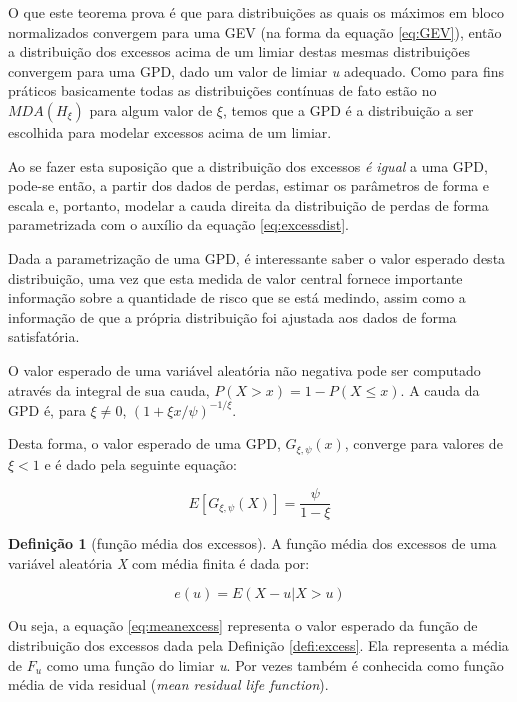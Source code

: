 \documentclass[review]{elsarticle}
\theoremstyle{definition}
\newtheorem{defi}[teor]{Definição}
\begin{document}
O que este teorema prova é que para distribuições as quais os máximos em bloco normalizados convergem para uma GEV (na forma da equação \eqref{eq:GEV}), então a distribuição dos excessos acima de um limiar destas mesmas distribuições convergem para uma GPD, dado um valor de limiar \emph{u} adequado. Como para fins práticos basicamente todas as distribuições contínuas de fato estão no $MDA(H_\xi)$ para algum valor de $\xi$, temos que a GPD é a distribuição a ser escolhida para modelar excessos acima de um limiar.

Ao se fazer esta suposição que a distribuição dos excessos \emph{é igual} a uma GPD, pode-se então, a partir dos dados de perdas, estimar os parâmetros de forma e escala e, portanto, modelar a cauda direita da distribuição de perdas de forma parametrizada com o auxílio da equação \eqref{eq:excessdist}. 


Dada a parametrização de uma GPD, é interessante saber o valor esperado desta distribuição, uma vez que esta medida de valor central fornece importante informação sobre a quantidade de risco que se está medindo, assim como a informação de que a própria distribuição foi ajustada aos dados de forma satisfatória.

O valor esperado de uma variável aleatória não negativa pode ser computado através da integral de sua cauda, $P(X>x) = 1-P(X \leq x)$. A cauda da GPD é, para $\xi \neq 0$, $\left(1+\xi x / \psi \right)^{-1/ \xi}$.

Desta forma, o valor esperado de uma GPD, $G_{\xi,\psi}(x)$, converge para valores de $\xi<1$ e é dado pela seguinte equação:

\begin{equation}
\label{eq:meanGPD}
E\left[G_{\xi,\psi} (X) \right]=\frac{\psi}{1-\xi}
\end{equation}


\begin{defi}[função média dos excessos]
	\label{defi:meanexcess}
	A função média dos excessos de uma variável aleatória \emph{X} com média finita é dada por:

	\begin{equation}
	\label{eq:meanexcess}
	e(u)=E\left(X-u | X > u\right)
	\end{equation}
\end{defi}

Ou seja, a equação \eqref{eq:meanexcess} representa o valor esperado da função de distribuição dos excessos dada pela Definição \ref{defi:excess}. Ela representa a média de $F_u$ como uma função do limiar \emph{u}. Por vezes também é conhecida como função média de vida residual (\emph{mean residual life function}).
\end{document}
